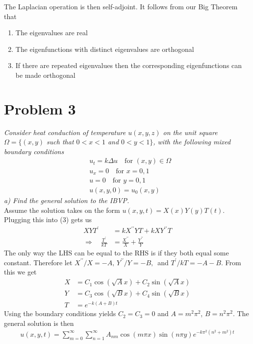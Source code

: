 \documentclass[12pt]{article}
\theoremstyle{remark}
\begin{document}
The Laplacian operation is then self-adjoint. It follows from our Big Theorem that 
\begin{enumerate}
	\item The eigenvalues are real
	\item The eigenfunctions with distinct eigenvalues are orthogonal 
	\item If there are repeated eigenvalues then the corresponding eigenfunctions can be made orthogonal
\end{enumerate}

\newpage

\section*{Problem 3}

\textit{Consider heat conduction of temperature $u(x,y,z)$ on the unit square $\Omega = \{(x,y)$ such that $0 < x < 1$ and $0 < y < 1\}$, with the following mixed boundary conditions}
\begin{align}
	& u_t = k\Delta u \quad \text{for }(x,y) \in \Omega \\
	& u_x = 0 \quad \text{for } x = 0,1 \\
	& u = 0 \quad \text{for } y = 0,1 \\
	& u(x,y,0) = u_0(x,y)
\end{align}
\textit{a) Find the general solution to the IBVP.} \\

Assume the solution takes on the form $u(x,y,t) = X(x)Y(y)T(t)$. Plugging this into (3) gets us
\begin{align*}
	XYT^\prime & = kX^{\prime\prime}YT + kXY^{\prime\prime}T \\
	\Rightarrow \quad \frac{T^\prime}{kT} & = \frac{X^{\prime\prime}}{X} + \frac{Y^{\prime\prime}}{Y}
\end{align*}
The only way the LHS can be equal to the RHS is if they both equal some constant. Therefore let $X^{\prime\prime}/X = -A, \, Y^{\prime\prime}/Y = -B, \,$ and $T^\prime/kT = -A - B$. From this we get 
\begin{align*}
	X & = C_1\cos(\sqrt{A}x) + C_2\sin(\sqrt{A}x) \\
	Y & = C_3\cos(\sqrt{B}x) + C_4\sin(\sqrt{B}x) \\
	T & = e^{-k(A+B)t}
\end{align*}
Using the boundary conditions yields $C_2 = C_3 = 0$ and $A = m^2\pi^2$, $B = n^2\pi^2$. The general solution is then 
\begin{align*}
	u(x,y,t) = \sum\limits_{m=0}^\infty\sum\limits_{n=1}^\infty A_{nm} \cos(m\pi x)\sin(n\pi y) e^{-k\pi^2(n^2 + m^2)t}
\end{align*}
\end{document}
